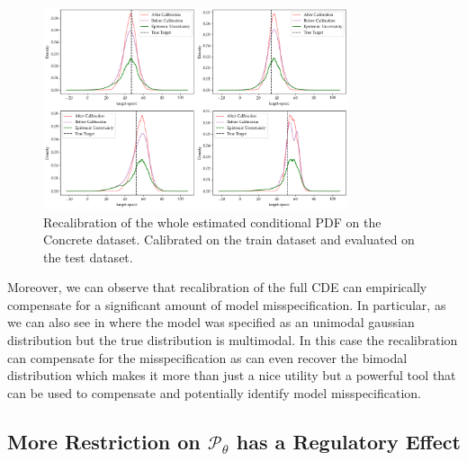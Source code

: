 \begin{figure}
    \centering
    \includegraphics[width=0.8\textwidth]{resources/recalibration_concrete_dataset.png}
    \caption{Recalibration of the whole estimated conditional PDF on the Concrete dataset. Calibrated on the train dataset and evaluated on the test dataset.}
    \label{fig:recalibration_concrete}
\end{figure}

Moreover, we can observe that recalibration of the full CDE can empirically compensate for a significant amount of model misspecification. In particular, as we can also see in  where the model was specified as an unimodal gaussian distribution but the true distribution is multimodal. In this case the recalibration can compensate for the misspecification as can even recover the bimodal distribution which makes it more than just a nice utility but a powerful tool that can be used to compensate and potentially identify model misspecification.

\subsection{More Restriction on $\mathscr{P}_\theta$ has a Regulatory Effect}\label{sec:experiment_results_more_restriction}

